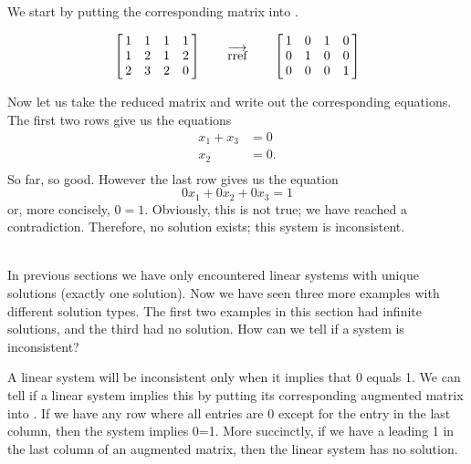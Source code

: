 


{We start by putting the corresponding matrix into \rref.

$$\bmx{cccc} 1&1&1&1\\1&2&1&2\\ 2&3&2&0\\ \emx \qquad \overrightarrow{\text{rref}} \qquad \bmx{cccc} 1&0&1&0\\ 0&1&0&0\\ 0&0&0&1\\ \emx$$

Now let us take the reduced matrix and write out the corresponding equations. The first two rows give us the equations \begin{align*} x_1+x_3&=0\\ x_2 &= 0.\\ \end{align*} So far, so good. However the last row gives us the equation $$0x_1+0x_2+0x_3 = 1$$ or, more concisely, $0=1$. Obviously, this is not true; we have reached a contradiction. Therefore, no solution exists; this system is inconsistent.}\\  %

In previous sections we have only encountered linear systems with unique solutions (exactly one solution). Now we have seen three more examples with different solution types. The first two examples in this section had infinite solutions, and the third had no solution. How can we tell if a system is inconsistent?

A linear system will be inconsistent only when it implies that 0 equals 1. We can tell if a linear system implies this by putting its corresponding augmented matrix into \rref. If we have any row where all entries are 0 except for the entry in the last column, then the system implies 0=1. More succinctly, if we have a leading 1 in the last column of an augmented matrix, then the linear system has no solution. 

 

